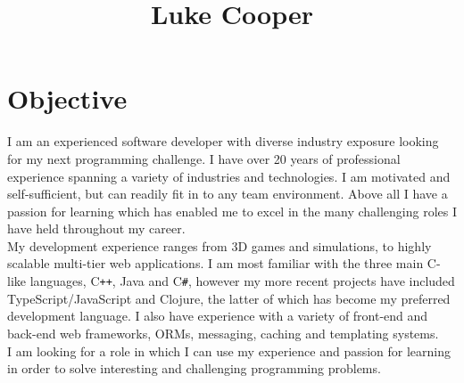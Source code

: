 \documentclass[11pt,a4paper]{article}
\title{\bfseries\LARGE {Luke Cooper}}
\author{}
\date{}
\def\Cplusplus{C{}\texttt{++}}
\def\Csharp{C{}\texttt{\#}}
\begin{document}
\maketitle

\vspace{-1em}
\noindent{}

\section*{Objective}

\noindent
I am an experienced software developer with diverse industry exposure looking for my next programming challenge. I have over 20 years of professional experience spanning a variety of industries and technologies. I am motivated and self-sufficient, but can readily fit in to any team environment. Above all I have a passion for learning which has enabled me to excel in the many challenging roles I have held throughout my career.\\

\noindent
My development experience ranges from 3D games and simulations, to highly scalable multi-tier web applications. I am most familiar with the three main C-like languages, {\Cplusplus}, Java and {\Csharp}, however my more recent projects have included TypeScript/JavaScript and Clojure, the latter of which has become my preferred development language. I also have experience with a variety of front-end and back-end web frameworks, ORMs, messaging, caching and templating systems.\\

\noindent
I am looking for a role in which I can use my experience and passion for learning in order to solve interesting and challenging programming problems. 
\end{document}
